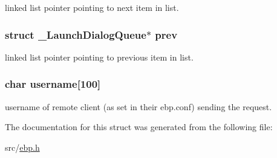 linked list pointer pointing to next item in list. 

\hypertarget{struct___launch_dialog_queue_afdf1225bcd61e554ebfcc98eacc3c234}{
\subsubsection[{prev}]{\setlength{\rightskip}{0pt plus 5cm}struct {\bf \-\_\-\-Launch\-Dialog\-Queue}$\ast$ {\bf prev}}}\label{struct___launch_dialog_queue_afdf1225bcd61e554ebfcc98eacc3c234}


linked list pointer pointing to previous item in list. 

\hypertarget{struct___launch_dialog_queue_a05eeba7fa0e9f1c4fcb8110937b46236}{
\subsubsection[{username}]{\setlength{\rightskip}{0pt plus 5cm}char {\bf username}\mbox{[}100\mbox{]}}}\label{struct___launch_dialog_queue_a05eeba7fa0e9f1c4fcb8110937b46236}


username of remote client (as set in their ebp.\-conf) sending the request. 



\-The documentation for this struct was generated from the following file\-:\begin{DoxyCompactItemize}
\item 
src/\hyperlink{ebp_8h}{ebp.\-h}\end{DoxyCompactItemize}
